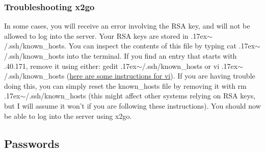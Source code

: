 \documentclass[final,titlepage,letterpaper,oneside,12pt]{article}
\renewcommand{\texttt}[2][BrickRed]{\textcolor{#1}{\ttfamily #2}}%
\newcommand{\atilde}{\raise.17ex\hbox{$\scriptstyle\mathtt{\sim}$}}
\begin{document}
\subsubsection{Troubleshooting x2go}

In some cases, you will receive an error involving the RSA key, and will not be allowed to log into the server. Your RSA keys are stored in \texttt{\atilde/.ssh/known\_hosts}. You can inspect the contents of this file by typing \texttt{cat \atilde/.ssh/known\_hosts} into the terminal. If you find an entry that starts with \texttt{130.63.40.171}, remove it using either: \texttt{gedit \atilde/.ssh/known\_hosts} or \texttt{vi \atilde/.ssh/known\_hosts} (\href{http://glaciated.org/vi/}{here are some instructions for vi}). If you are having trouble doing this, you can simply reset the \texttt{known\_hosts} file by removing it with \texttt{rm \atilde/.ssh/known\_hosts} (this might affect other systems relying on RSA keys, but I will assume it won't if you are following these instructions). You should now be able to log into the server using x2go.

\subsection{Passwords}
\end{document}
